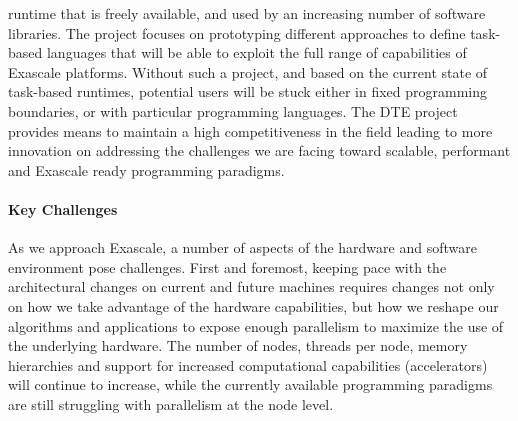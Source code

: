 runtime that is freely available, and used by an increasing number of software
libraries.
The project focuses on prototyping different approaches to define task-based
languages that will be able to exploit the full range of capabilities of
Exascale platforms. Without such a project, and based on the current state of
task-based runtimes, potential users will be stuck either in fixed programming
boundaries, or with particular programming languages. The DTE project provides
means to maintain a high competitiveness in the field leading to more innovation
on addressing the challenges we are facing toward scalable, performant and
Exascale ready programming paradigms.

\paragraph{Key  Challenges}

As we approach Exascale, a number of aspects of the hardware and software
environment pose challenges. First and foremost, keeping pace with the
architectural changes on current and future machines requires changes not only
on how we take advantage of the hardware capabilities, but how we reshape our
algorithms and applications to expose enough parallelism to maximize the use of
the underlying hardware. The number of nodes, threads per node, memory
hierarchies and support for increased computational capabilities (accelerators)
will continue to increase, while the currently available programming paradigms
are still struggling with parallelism at the node level.

